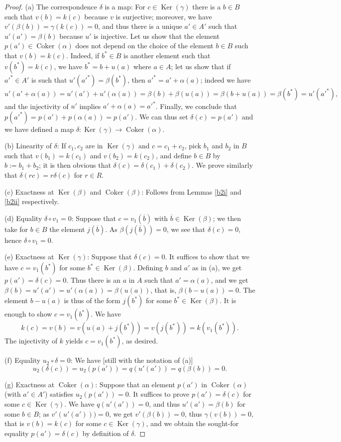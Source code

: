 \documentclass[12pt,letterpaper]{article}%
\newcommand{\oo}{\operatorname}\newcommand{\ooo}{\operatorname*}
\newcommand{\nn}{\noindent}
\begin{document}
\begin{proof} (a) The correspondence $\delta$ is a map: For $c\in\oo{Ker}(\gamma)$ there is a $b\in B$ such that $v(b)=k(c)$ because $v$ is surjective; moreover, we have $v'(\beta(b))=\gamma(k(c))=0$, and thus there is a unique $a'\in A'$ such that $u'(a')=\beta(b)$ because $u'$ is injective. Let us show that the element $p(a')\in\oo{Coker}(\alpha)$ does not depend on the choice of the element $b\in B$ such that $v(b)=k(c)$. Indeed, if $b^*\in B$ is another element such that $v(b^*)=k(c)$, we have $b^*=b+u(a)$ where $a\in A$; let us show that if $a'^*\in A'$ is such that $u'(a'^*)=\beta(b^*)$, then $a'^*=a'+\alpha(a)$; indeed we have 
$$
u'(a'+\alpha(a))=u'(a')+u'(\alpha(a))=\beta(b)+\beta(u(a))=\beta(b+u(a))=\beta(b^*)=u'(a'^*),
$$ 
and the injectivity of $u'$ implies $a'+\alpha(a)=a'^*$. Finally, we conclude that $p(a'^*)=p(a')+p(\alpha(a))=p(a')$. We can thus set $\delta(c)=p(a')$ and we have defined a map $\delta:\oo{Ker}(\gamma)\to\oo{Coker}(\alpha)$.

\nn(b) Linearity of $\delta$: If $c_1,c_2$ are in $\oo{Ker}(\gamma)$ and $c=c_1+c_2$, pick $b_1$ and $b_2$ in $B$ such that $v(b_1)=k(c_1)$ and $v(b_2)=k(c_2)$, and define $b\in B$ by $b:=b_1+b_2$; it is then obvious that $\delta(c)=\delta(c_1)+\delta(c_2)$. We prove similarly that $\delta(rc)=r\delta(c)$ for $r\in R$.

\nn(c) Exactness at $\oo{Ker}(\beta)$ and $\oo{Coker}(\beta)$: Follows from Lemmas \ref{b2i} and \ref{b2ii} respectively.

\nn(d) Equality $\delta\circ v_1=0$: Suppose that $c=v_1(\overline b)$ with $\overline b\in\oo{Ker}(\beta)$; we then take for $b\in B$ the element $j(\overline b)$. As $\beta(j(\overline b))=0$, we see that $\delta(c)=0$, hence $\delta\circ v_1=0$. 

\nn(e) Exactness at $\oo{Ker}(\gamma)$: Suppose that $\delta(c)=0$. It suffices to show that we have $c=v_1(b^*)$ for some $b^*\in\oo{Ker}(\beta)$. Defining $b$ and $a'$ as in (a), we get $p(a')=\delta(c)=0$. Thus there is an $a$ in $A$ such that $a'=\alpha(a)$, 
and we get $\beta(b)=u'(a')=u'(\alpha(a))=\beta(u(a))$, that is, $\beta(b-u(a))=0$. The element $b-u(a)$ is thus of the form $j(b^*)$ for some $b^*\in\oo{Ker}(\beta)$. It is enough to show $c=v_1(b^*)$. We have 
$$
k(c)=v(b)= v(u(a)+j(b^*))=v(j(b^*))=k(v_1(b^*)).
$$ 
The injectivity of $k$ yields $c=v_1(b^*)$, as desired.

\nn(f) Equality $u_2\circ\delta=0$: We have [still with the notation of (a)] 
$$
u_2(\delta(c))=u_2(p(a'))=q(u'(a'))=q(\beta(b))=0.
$$ 

\nn(g) Exactness at $\oo{Coker}(\alpha)$: Suppose that an element $p(a')$ in $\oo{Coker}(\alpha)$ (with $a'\in A'$) satisfies $u_2(p(a'))=0$. It suffices to prove $p(a')=\delta(c)$ for some $c\in\oo{Ker}(\gamma)$. We have $q(u'(a'))=0$, and thus $u'(a')=\beta(b)$ for some $b\in B$; as $v'(u'(a')))=0$, we get $v'(\beta(b))=0$, thus $\gamma(v(b))=0$, that is $v(b)=k(c)$ for some $c\in\oo{Ker}(\gamma)$, and we obtain the sought-for equality $p(a')=\delta(c)$ by definition of $\delta$.
\end{proof}
\end{document}
